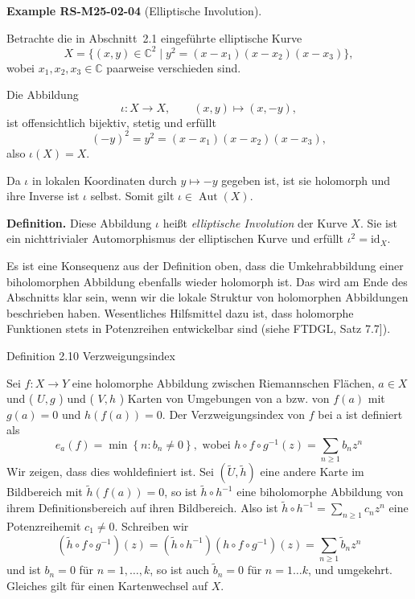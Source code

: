 \documentclass[10pt, letterpaper]{article}
\newcommand{\C}{\mathbb{C}}
\newcommand{\CustomHeading}[3]{%
  \par\medskip\noindent%
  \textbf{#1 #2} \textnormal{(#3)}.\enskip%
}
\newenvironment{EXA}[2]{\begin{unitbox}\CustomHeading{Example}{#1}{#2}}{\end{unitbox}}
\begin{document}
\begin{EXA}{RS-M25-02-04}{Elliptische Involution}
Betrachte die in Abschnitt~2.1 eingeführte elliptische Kurve
\[
X=\{(x,y)\in\C^2 \mid y^2=(x-x_1)(x-x_2)(x-x_3)\},
\]
wobei $x_1,x_2,x_3\in\C$ paarweise verschieden sind.  

Die Abbildung
\[
\iota:X\longrightarrow X,\qquad (x,y)\longmapsto(x,-y),
\]
ist offensichtlich bijektiv, stetig und erfüllt
\[
(-y)^2 = y^2 = (x-x_1)(x-x_2)(x-x_3),
\]
also $\iota(X)=X$.  

Da $\iota$ in lokalen Koordinaten durch $y\mapsto -y$ gegeben ist, ist sie holomorph und ihre Inverse ist $\iota$ selbst. Somit gilt $\iota\in\operatorname{Aut}(X)$.

\textbf{Definition.}
Diese Abbildung $\iota$ heißt \emph{elliptische Involution} der Kurve $X$.  
Sie ist ein nichttrivialer Automorphismus der elliptischen Kurve und erfüllt $\iota^2=\mathrm{id}_X$.
\end{EXA}


Es ist eine Konsequenz aus der Definition oben, dass die Umkehrabbildung einer biholomorphen Abbildung ebenfalls wieder holomorph ist. Das wird am Ende des Abschnitts klar sein, wenn wir die lokale Struktur von holomorphen Abbildungen beschrieben haben. Wesentliches Hilfsmittel dazu ist, dass holomorphe Funktionen stets in Potenzreihen entwickelbar sind (siehe FTDGL, Satz 7.7]).


Definition 2.10 Verzweigungsindex 

Sei $f: X \rightarrow Y$ eine holomorphe Abbildung zwischen Riemannschen Flächen, $a \in X$ und ( $U, g$ ) und ( $V, h$ ) Karten von Umgebungen von a bzw. von $f(a)$ mit $g(a)=0$ und $h(f(a))=0$. Der Verzweigungsindex von $f$ bei a ist definiert als
$$
e_{a}(f)=\min \left\{n: b_{n} \neq 0\right\}, \text { wobei } h \circ f \circ g^{-1}(z)=\sum_{n \geq 1} b_{n} z^{n}
$$
Wir zeigen, dass dies wohldefiniert ist. Sei $(\widetilde{U}, \widetilde{h})$ eine andere Karte im Bildbereich mit $\widetilde{h}(f(a))=0$, so ist $\widetilde{h} \circ h^{-1}$ eine biholomorphe Abbildung von ihrem Definitionsbereich auf ihren Bildbereich. Also ist $\widetilde{h} \circ h^{-1}=\sum_{n \geq 1} c_{n} z^{n}$ eine Potenzreihemit $c_{1} \neq 0$. Schreiben wir
$$
\left(\widetilde{h} \circ f \circ g^{-1}\right)(z)=\left(\widetilde{h} \circ h^{-1}\right)\left(h \circ f \circ g^{-1}\right)(z)=\sum_{n \geq 1} \widetilde{b}_{n} z^{n}
$$
und ist $b_{n}=0$ für $n=1, \ldots, k$, so ist auch $\widetilde{b}_{n}=0$ für $n=1 \ldots k$, und umgekehrt. Gleiches gilt für einen Kartenwechsel auf $X$.
\end{document}
